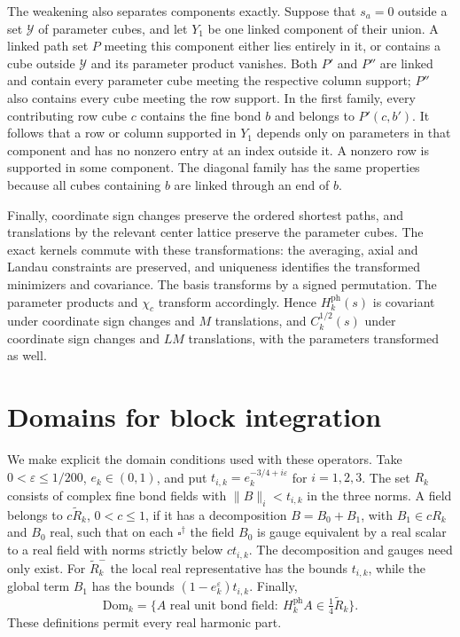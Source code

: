 \documentclass[11pt,letterpaper,reqno]{amsart}
\begin{document}
The weakening also separates components exactly. Suppose that
$s_a=0$ outside a set $\mathscr Y$ of parameter cubes, and let
$Y_1$ be one linked component of their union. A linked path set
$P$ meeting this component either lies entirely in it, or
contains a cube outside $\mathscr Y$ and its parameter product
vanishes. Both $P'$ and $P''$ are linked and contain every
parameter cube meeting the respective column support; $P''$
also contains every cube meeting the row support. In the first
family, every contributing row cube $c$ contains the fine bond
$b$ and belongs to $P'(c,b')$. It follows that a row or column
supported in $Y_1$ depends only on parameters in that component
and has no nonzero entry at an index outside it. A nonzero row
is supported in some component. The diagonal family has the
same properties because all cubes containing $b$ are linked
through an end of $b$.

Finally, coordinate sign changes preserve the ordered shortest
paths, and translations by the relevant center lattice preserve
the parameter cubes. The exact kernels commute with these
transformations: the averaging, axial and Landau constraints
are preserved, and uniqueness identifies the transformed
minimizers and covariance. The basis transforms by a signed
permutation. The parameter products and $\chi_c$ transform
accordingly. Hence $H_k^{\mathrm{ph}}(s)$ is covariant under
coordinate sign changes and $M$ translations, and
$C_k^{1/2}(s)$ under coordinate sign changes and $LM$
translations, with the parameters transformed as well.

\section{Domains for block integration}
\label{subsec:photon-domain-bounds}

We make explicit the domain conditions used with these operators.
Take $0<\varepsilon\le1/200$, $e_k\in(0,1)$, and put
$t_{i,k}=e_k^{-3/4+i\varepsilon}$ for $i=1,2,3$.
The set $R_k$ consists of complex fine bond fields with
$\|B\|_i<t_{i,k}$ in the three norms. A field belongs to
$c\widetilde R_k$, $0<c\le1$, if it has a decomposition
$B=B_0+B_1$, with $B_1\in cR_k$ and $B_0$ real, such that on
each $\square^\dagger$ the field $B_0$ is gauge equivalent by a real scalar
to a real field with norms strictly below $ct_{i,k}$.
The decomposition and gauges need only exist. For
$\widetilde R_k^-$ the local real representative has the bounds
$t_{i,k}$, while the global term $B_1$ has the bounds
$(1-e_k^\varepsilon)t_{i,k}$. Finally,
\[
 \mathrm{Dom}_k=
 \{A\text{ real unit bond field}:\ H_k^{\mathrm{ph}}A
                                      \in\tfrac14\widetilde R_k\}.
\]
These definitions permit every real harmonic part.
\end{document}
